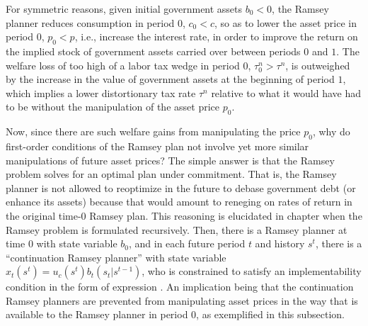 For symmetric reasons, given initial government assets $b_0<0$, the
Ramsey planner reduces consumption in period $0$,
$c_0 < c$, so as to lower the asset price in period $0$, $p_0<p$,
i.e., increase the interest rate, in order to improve the return on
the implied stock of government assets carried over between periods
$0$ and $1$. The welfare loss of too high of a labor tax wedge in
period $0$, $\tau^n_0 > \tau^n$, is outweighed by the increase in the
value of government assets at the beginning of period $1$, which
implies a lower distortionary tax rate $\tau^n$
relative to what it would have had to be without the manipulation
of the asset price $p_0$.

Now, since there are such welfare gains from manipulating the
price $p_0$, why do first-order conditions  of the
Ramsey plan not involve yet more similar manipulations of future
asset prices?
The simple answer is that the Ramsey problem solves for an optimal
plan under commitment. That is, the Ramsey planner is not allowed
to reoptimize in the future to debase government debt (or enhance
its assets) because that would amount to reneging on rates of
return in the original time-$0$ Ramsey plan.
This reasoning is elucidated in
chapter  when the Ramsey problem is formulated
recursively. Then, there is a Ramsey planner at time $0$ with
state variable $b_0$, and in each future period $t$ and history
$s^t$, there is a ``continuation Ramsey planner'' with state
variable $x_t(s^t) = u_c(s^t) b_t(s_t | s^{t-1})$, who is
constrained to satisfy an implementability condition in the form
of expression . An implication being that the
continuation Ramsey planners are prevented from manipulating
asset prices in the way that is available to the Ramsey planner
in period $0$, as exemplified in this subsection.




